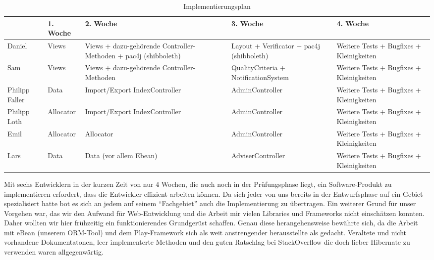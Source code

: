 \documentclass[parskip=full]{scrartcl}
\begin{document}
\begin{table}[H]
\begin{tabularx}{\textwidth}{|l|l|X|X|X|}
\hline
 	& 1. Woche			& 2. Woche		& 3. Woche & 4. Woche\\
\hline 
Daniel	& Views			& Views + dazu-gehörende Controller-Methoden + pac4j 
(shibboleth) & Layout + Verificator
+ pac4j (shibboleth)& Weitere Tests +
Bugfixes +
Kleinigkeiten\\
\hline
Sam & Views&Views +
dazu-gehörende
Controller-
Methoden & QualityCriteria +
NotificationSystem & Weitere Tests +
Bugfixes +
Kleinigkeiten\\
\hline
Philipp Faller&Data&Import/Export
IndexController&AdminController&Weitere Tests +
Bugfixes +
Kleinigkeiten\\
\hline
Philipp Loth&Allocator&Import/Export
IndexController&AdminController&Weitere Tests +
Bugfixes +
Kleinigkeiten\\
\hline
Emil&Allocator&Allocator&AdminController&Weitere Tests +
Bugfixes +
Kleinigkeiten\\
\hline
Lars&Data&Data (vor allem
Ebean)&AdviserController&Weitere Tests +
Bugfixes +
Kleinigkeiten\\
\hline
\end{tabularx}
\caption{Implementierungsplan}
\end{table}
Mit sechs Entwicklern in der kurzen Zeit von nur 4 Wochen, die auch noch in der
Prüfungsphase liegt, ein Software-Produkt zu implementieren erfordert, dass die
Entwickler effizient arbeiten können. Da sich jeder von uns bereits in der
Entwurfsphase auf ein Gebiet spezialisiert hatte bot es sich an jedem auf seinem
\enquote{Fachgebiet} auch die Implementierung zu übertragen. 
Ein weiterer Grund für unser Vorgehen war, das wir den Aufwand für
Web-Entwicklung und die Arbeit mir vielen Libraries und Frameworks 
nicht einschätzen konnten. Daher
wollten wir hier frühzeitig ein funktionierendes Grundgerüst schaffen.
Genau diese herangehensweise bewährte sich, da die Arbeit mit eBean (unserem
ORM-Tool) und dem Play-Framework sich als weit anstrengender herausstellte als
gedacht. Veraltete und nicht vorhandene Dokumentatonen, leer implementerte
Methoden und den guten Ratschlag bei StackOverflow die doch
lieber Hibernate zu verwenden waren allgegenwärtig.
\end{document}
